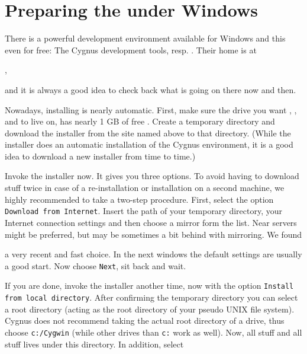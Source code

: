 \section{Preparing the  under Windows\label{preparewin}}

There is a powerful development environment available for Windows and this even for free:
The Cygnus development tools, resp. \Cygwin. Their home
is at
 \medskip

,
 \medskip

 \noindent
and it is always a good idea to check back what is going on there now and then.

Nowadays, installing \Cygwin{} is nearly automatic. First, make sure
the drive you want \Cygwin{}, \PLIB{}, \SimGear{} and \FlightGear{} to live on, has
nearly 1 GB of free . Create a temporary directory and download the
installer from the site named above to that directory. (While the installer does an
automatic installation of the Cygnus environment, it is a good idea to download a new
installer from time to time.)

Invoke the installer now. It gives you three options. To avoid having to download stuff
twice in case of a re-installation or installation on a second machine, we highly
recommended to take a two-step procedure. First, select the option \texttt{Download from
Internet}. Insert the path of your temporary directory, your Internet connection settings
and then choose a mirror form the list. Near servers might be preferred, but may be
sometimes a bit behind with mirroring. We found
\medskip

\medskip

 \noindent
a very recent and fast choice. In the next windows the default settings are usually a
good start. Now choose \texttt{Next}, sit back and wait.

If you are done, invoke the installer another time, now with the option
\texttt{Install from local directory}. After confirming the temporary directory you can
select a root directory (acting as the root directory of your pseudo UNIX file system).
Cygnus does not recommend taking the actual root directory of a drive, thus choose
\texttt{c:/Cygwin} (while other drives than \texttt{c:} work as well). Now, all \Cygwin{} stuff and all \FlightGear{} stuff lives under this directory. In addition, select

